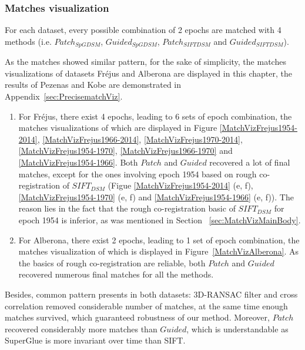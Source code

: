 \subsubsection{Matches visualization}
\label{matchVizMainBody}
For each dataset, every possible combination of 2 epochs are matched with 4 methods (i.e.  $Patch_{SpGDSM}$,  $Guided_{SpGDSM}$,  $Patch_{SIFTDSM}$ and  $Guided_{SIFTDSM}$). 

As the matches showed similar pattern, for the sake of simplicity, the matches visualizations of datasets Fr{\'e}jus and Alberona are displayed in this chapter, the results of Pezenas and Kobe are demonstrated in Appendix~\ref{sec:PrecisematchViz}.\\

\begin{enumerate}
	\item For Fr{\'e}jus, there exist 4 epochs, leading to 6 sets of epoch combination, the matches visualizations of which are displayed in Figure \ref{MatchVizFrejus1954-2014}, \ref{MatchVizFrejus1966-2014}, \ref{MatchVizFrejus1970-2014}, \ref{MatchVizFrejus1954-1970}, \ref{MatchVizFrejus1966-1970} and \ref{MatchVizFrejus1954-1966}. Both $Patch$ and $Guided$ recovered a lot of final matches, except for the ones involving epoch 1954 based on rough co-registration of $SIFT_{DSM}$ (Figue \ref{MatchVizFrejus1954-2014} (e, f), \ref{MatchVizFrejus1954-1970} (e, f) and \ref{MatchVizFrejus1954-1966} (e, f)). The reason lies in the fact that the rough co-registration basic of $SIFT_{DSM}$ for epoch 1954 is inferior, as was mentioned in Section ~\ref{sec:MatchVizMainBody}.

	\item For Alberona, there exist 2 epochs, leading to 1 set of epoch combination, the matches visualization of which is displayed in Figure~\ref{MatchVizAlberona}. As the basics of rough co-registration are reliable, both $Patch$ and $Guided$ recovered numerous final matches for all the methods.
\end{enumerate}

Besides, common pattern presents in both datasets: 3D-RANSAC filter and cross correlation removed considerable number of matches, at the same time enough matches survived, which guaranteed robustness of our method. Moreover, $Patch$ recovered considerably more matches than $Guided$, which is understandable as SuperGlue is more invariant over time than SIFT.\\

